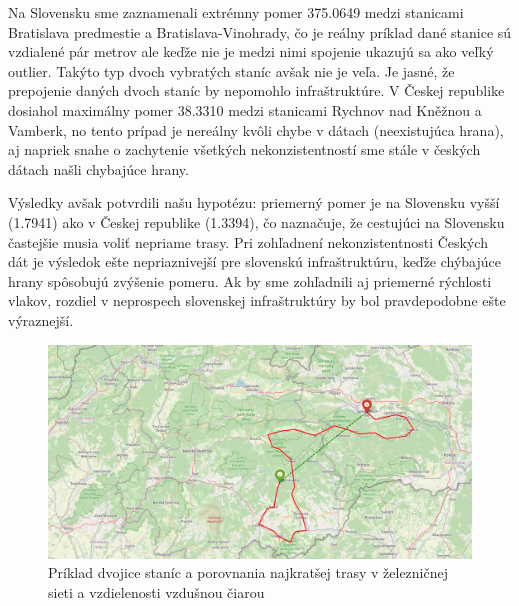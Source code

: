 \documentclass[main.tex]{subfiles}
\begin{document}
Na Slovensku sme zaznamenali extrémny pomer 375.0649 medzi stanicami Bratislava predmestie a Bratislava-Vinohrady, čo je reálny príklad dané stanice sú vzdialené pár metrov ale keďže nie je medzi nimi spojenie ukazujú sa ako veľký outlier. Takýto typ dvoch vybratých staníc avšak nie je veľa. Je jasné, že prepojenie daných dvoch staníc by nepomohlo infraštruktúre. V Českej republike dosiahol maximálny pomer 38.3310 medzi stanicami Rychnov nad Kněžnou a Vamberk, no tento prípad je nereálny kvôli chybe v dátach (neexistujúca hrana), aj napriek snahe o zachytenie všetkých nekonzistentností sme stále v českých dátach našli chybajúce hrany. 


Výsledky avšak potvrdili našu hypotézu: priemerný pomer je na Slovensku vyšší (1.7941) ako v Českej republike (1.3394), čo naznačuje, že cestujúci na Slovensku častejšie musia voliť nepriame trasy. Pri zohľadnení nekonzistentnosti Českých dát je výsledok ešte nepriaznivejší pre slovenskú infraštruktúru, keďže chýbajúce hrany spôsobujú zvýšenie pomeru. Ak by sme zohľadnili aj priemerné rýchlosti vlakov, rozdiel v neprospech slovenskej infraštruktúry by bol pravdepodobne ešte výraznejší.

\begin{figure}
\centerline{\includegraphics[width=1.2\textwidth]{images/sk_shortest_path_vs_skyline.png}}
\caption{Príklad dvojice staníc a porovnania najkratšej trasy v železničnej sieti a vzdielenosti vzdušnou čiarou}
\label{obr:svk_skyline_vs_shortest}
\end{figure}
\end{document}
